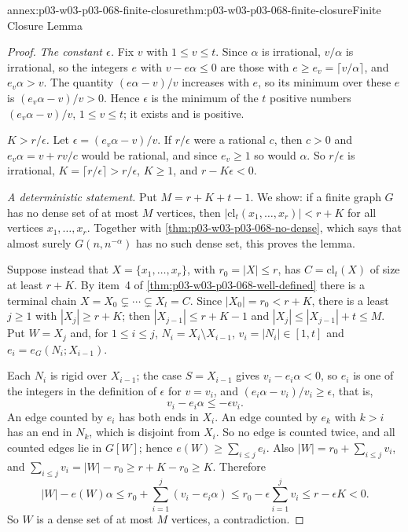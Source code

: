\begin{annexitem}{annex:p03-w03-p03-068-finite-closure}{thm:p03-w03-p03-068-finite-closure}{Finite Closure Lemma}
\begin{proof}
\emph{The constant \(\epsilon\).}  Fix \(v\) with \(1\leq v\leq t\).  Since
\(\alpha\) is irrational, \(v/\alpha\) is irrational, so the integers \(e\)
with \(v-e\alpha\leq0\) are those with \(e\geq e_v=\lceil v/\alpha\rceil\), and
\(e_v\alpha>v\).  The quantity \((e\alpha-v)/v\) increases with \(e\), so its
minimum over these \(e\) is \((e_v\alpha-v)/v>0\).  Hence \(\epsilon\) is the
minimum of the \(t\) positive numbers \((e_v\alpha-v)/v\), \(1\leq v\leq t\);
it exists and is positive.

\emph{\(K>r/\epsilon\).}  Let \(\epsilon=(e_v\alpha-v)/v\).  If \(r/\epsilon\)
were a rational \(c\), then \(c>0\) and \(e_v\alpha=v+rv/c\) would be rational,
and since \(e_v\geq1\) so would \(\alpha\).  So \(r/\epsilon\) is irrational,
\(K=\lceil r/\epsilon\rceil>r/\epsilon\), \(K\geq1\), and \(r-K\epsilon<0\).

\emph{A deterministic statement.}  Put \(M=r+K+t-1\).  We show: if a finite
graph \(G\) has no dense set of at most \(M\) vertices, then
\(|\mathrm{cl}_t(x_1,\ldots,x_r)|<r+K\) for all vertices \(x_1,\ldots,x_r\).
Together with \cref{thm:p03-w03-p03-068-no-dense}, which says that almost
surely \(G(n,n^{-\alpha})\) has no such dense set, this proves the lemma.

Suppose instead that \(X=\{x_1,\ldots,x_r\}\), with \(r_0=|X|\leq r\), has
\(C=\mathrm{cl}_t(X)\) of size at least \(r+K\).  By item~4 of
\cref{thm:p03-w03-p03-068-well-defined} there is a terminal chain
\(X=X_0\subsetneq\cdots\subsetneq X_l=C\).  Since \(|X_0|=r_0<r+K\), there is a
least \(j\geq1\) with \(|X_j|\geq r+K\); then \(|X_{j-1}|\leq r+K-1\) and
\(|X_j|\leq|X_{j-1}|+t\leq M\).  Put \(W=X_j\) and, for \(1\leq i\leq j\),
\(N_i=X_i\setminus X_{i-1}\), \(v_i=|N_i|\in[1,t]\) and
\(e_i=e_G(N_i;X_{i-1})\).

Each \(N_i\) is rigid over \(X_{i-1}\); the case \(S=X_{i-1}\) gives
\(v_i-e_i\alpha<0\), so \(e_i\) is one of the integers in the definition of
\(\epsilon\) for \(v=v_i\), and \((e_i\alpha-v_i)/v_i\geq\epsilon\), that is,
\[
  v_i-e_i\alpha\leq-\epsilon v_i .
\]
An edge counted by \(e_i\) has both ends in \(X_i\).  An edge counted by
\(e_k\) with \(k>i\) has an end in \(N_k\), which is disjoint from \(X_i\).
So no edge is counted twice, and all counted edges lie in \(G[W]\); hence
\(e(W)\geq\sum_{i\leq j}e_i\).  Also \(|W|=r_0+\sum_{i\leq j}v_i\), and
\(\sum_{i\leq j}v_i=|W|-r_0\geq r+K-r_0\geq K\).  Therefore
\[
  |W|-e(W)\alpha\leq r_0+\sum_{i=1}^{j}(v_i-e_i\alpha)
  \leq r_0-\epsilon\sum_{i=1}^{j}v_i\leq r-\epsilon K<0 .
\]
So \(W\) is a dense set of at most \(M\) vertices, a contradiction.
\end{proof}
\end{annexitem}

